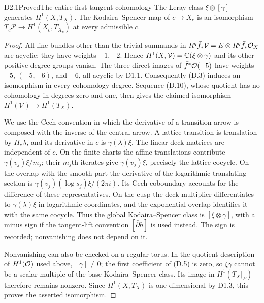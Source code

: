 \begin{claim}{D2.1}{Proved}{The entire first tangent cohomology}
The Leray class $\xi\otimes[\gamma]$ generates $H^1(X,T_X)$.
The Kodaira--Spencer map of $c\mapsto X_c$ is an isomorphism
$T_c\mathcal P\to H^1(X_c,T_{X_c})$ at every admissible $c$.
\end{claim}
\begin{proof}
All line bundles other than the trivial summands in
$R^q\bar f_*\mathcal V=E\otimes R^q\bar f_*\mathcal O_X$ are acyclic:
they have weights $-1,-2$. Hence $H^1(X,\mathcal V)=
\mathbb C(\xi\otimes\gamma)$ and its other positive-degree groups vanish.
The three direct images of $\bar f^*\mathcal O(-5)$ have weights
$-5$, $(-5,-6)$, and $-6$, all acyclic by D1.1. Consequently (D.3)
induces an isomorphism in every cohomology degree. Sequence (D.10),
whose quotient has no cohomology in degrees zero and one, then gives
the claimed isomorphism $H^1(\mathcal V)\to H^1(T_X)$.

We use the Cech convention in which the derivative of a transition
arrow is composed with the inverse of the central arrow. A lattice
transition is translation by $\Pi_c\lambda$, and its derivative in
$c$ is $\gamma(\lambda)\xi$. The linear deck matrices are independent
of $c$. On the finite charts the affine translations contribute
$\gamma(v_j)\xi/m_j$; their $m_j$th iterates give
$\gamma(v_j)\xi$, precisely the lattice cocycle. On the overlap with
the smooth part the derivative of the logarithmic translating section
is $\gamma(v_j)(\log s_j)\xi/(2\pi i)$. Its Cech coboundary accounts
for the difference of these representatives. On the cusp the deck
multiplier differentiates to $\gamma(\lambda)\xi$ in logarithmic
coordinates, and the exponential overlap identifies it with the same
cocycle. Thus the global Kodaira--Spencer class is
$[\xi\otimes\gamma]$, with a minus sign if the tangent-lift convention
$[\bar\partial h]$ is used instead. The sign is recorded; nonvanishing
does not depend on it.

Nonvanishing can also be checked on a regular torus. In the quotient
description of $H^1(\mathcal O)$ used above, $[\gamma]\ne0$; the first
coefficient of (D.5) is zero, so $\xi\gamma$ cannot be a scalar
multiple of the base Kodaira--Spencer class. Its image in
$H^1(T_X|_F)$ therefore remains nonzero. Since $H^1(X,T_X)$ is
one-dimensional by D1.3, this proves the asserted isomorphism.
\end{proof}


